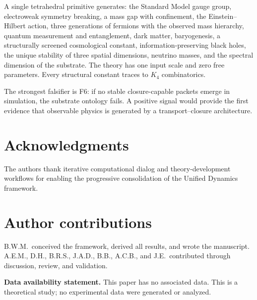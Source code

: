 \documentclass[11pt,twocolumn]{article}
\begin{document}
A single tetrahedral primitive generates: the Standard Model gauge group, electroweak symmetry breaking, a mass gap with confinement, the Einstein--Hilbert action, three generations of fermions with the observed mass hierarchy, quantum measurement and entanglement, dark matter, baryogenesis, a structurally screened cosmological constant, information-preserving black holes, the unique stability of three spatial dimensions, neutrino masses, and the spectral dimension of the substrate.
The theory has one input scale and zero free parameters.
Every structural constant traces to $K_4$ combinatorics.

The strongest falsifier is F6: if no stable closure-capable packets emerge in simulation, the substrate ontology fails.
A positive signal would provide the first evidence that observable physics is generated by a transport--closure architecture.

\section*{Acknowledgments}
The authors thank iterative computational dialog and theory-development workflows for enabling the progressive consolidation of the Unified Dynamics framework.

\section*{Author contributions}
B.W.M.\ conceived the framework, derived all results, and wrote the manuscript.
A.E.M., D.H., B.R.S., J.A.D., B.B., A.C.B., and J.E.\ contributed through discussion, review, and validation.

\smallskip
\noindent\textbf{Data availability statement.}
This paper has no associated data.
This is a theoretical study; no experimental data were generated or analyzed.
\end{document}
